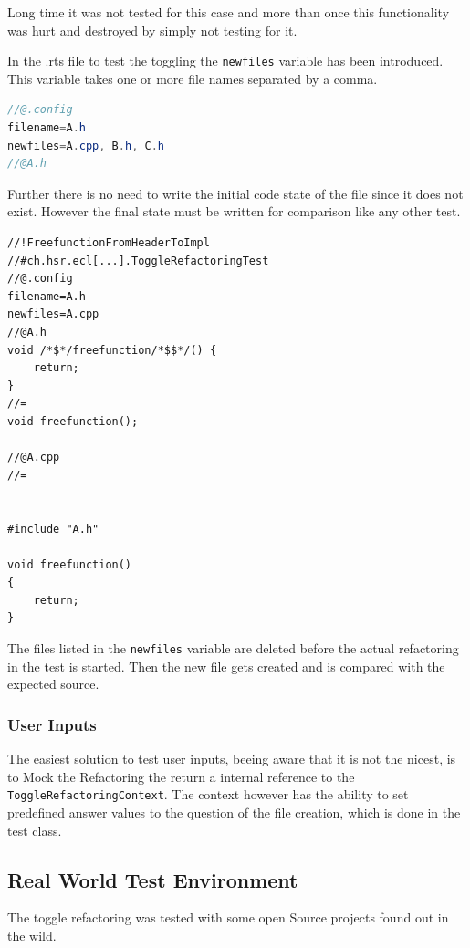 Long time it was not tested for this case and more than once this functionality
was hurt and destroyed by simply not testing for it. 

In the .rts file to test the toggling the \texttt{newfiles} variable has been
introduced. This variable takes one or more file names separated by a comma.

\begin{lstlisting}[caption={Syntax to set variables inside a .rts file},
language=java]
//@.config
filename=A.h
newfiles=A.cpp, B.h, C.h
//@A.h
\end{lstlisting}

Further there is no need to write the initial code state of the file since it
does not exist. However the final state must be written for comparison like
any other test.

\begin{lstlisting}[caption={Writing newfile test}]
//!FreefunctionFromHeaderToImpl
//#ch.hsr.ecl[...].ToggleRefactoringTest
//@.config
filename=A.h
newfiles=A.cpp
//@A.h
void /*$*/freefunction/*$$*/() {
    return;
}
//=
void freefunction();

//@A.cpp
//=


#include "A.h"

void freefunction()
{
    return;
}
\end{lstlisting}

The files listed in the \texttt{newfiles} variable are deleted before the
actual refactoring in the test is started. Then the new file gets created and
is compared with the expected source.


\subsubsection{User Inputs}

The easiest solution to test user inputs, beeing aware that it is not the
nicest, is to Mock the Refactoring the return a internal reference to the
\texttt{ToggleRefactoringContext}. The context however has the ability to set
predefined answer values to the question of the file creation, which is done in
the test class.

\subsection{Real World Test Environment}

The toggle refactoring was tested with some open Source projects found out in
the wild.

